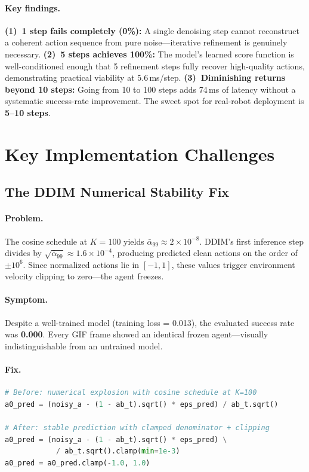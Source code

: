 \documentclass[10pt,letterpaper]{article}
\newcommand{\alphabar}{\bar{\alpha}}
\begin{document}
\paragraph{Key findings.}
\textbf{(1)~1 step fails completely (0\%):} A single denoising step cannot
reconstruct a coherent action sequence from pure noise---iterative refinement is
genuinely necessary.
\textbf{(2)~5 steps achieves 100\%:} The model's learned score function is
well-conditioned enough that 5 refinement steps fully recover high-quality actions,
demonstrating practical viability at 5.6\,ms/step.
\textbf{(3)~Diminishing returns beyond 10 steps:} Going from 10 to 100 steps adds
74\,ms of latency without a systematic success-rate improvement.
The sweet spot for real-robot deployment is \textbf{5--10 steps}.

\section{Key Implementation Challenges}
\label{sec:challenges}

\subsection{The DDIM Numerical Stability Fix}

\paragraph{Problem.}
The cosine schedule at $K{=}100$ yields $\alphabar_{99} \approx 2{\times}10^{-8}$.
DDIM's first inference step divides by
$\sqrt{\alphabar_{99}} \approx 1.6{\times}10^{-4}$,
producing predicted clean actions on the order of $\pm 10^6$.
Since normalized actions lie in $[-1, 1]$, these values trigger environment
velocity clipping to zero---the agent freezes.

\paragraph{Symptom.}
Despite a well-trained model (training loss = 0.013), the evaluated success rate
was \textbf{0.000}.
Every GIF frame showed an identical frozen agent---visually indistinguishable from
an untrained model.

\paragraph{Fix.}
\begin{lstlisting}[language=Python, caption={DDIM numerical stability fix (two lines).}]
# Before: numerical explosion with cosine schedule at K=100
a0_pred = (noisy_a - (1 - ab_t).sqrt() * eps_pred) / ab_t.sqrt()

# After: stable prediction with clamped denominator + clipping
a0_pred = (noisy_a - (1 - ab_t).sqrt() * eps_pred) \
            / ab_t.sqrt().clamp(min=1e-3)
a0_pred = a0_pred.clamp(-1.0, 1.0)
\end{lstlisting}
\end{document}
